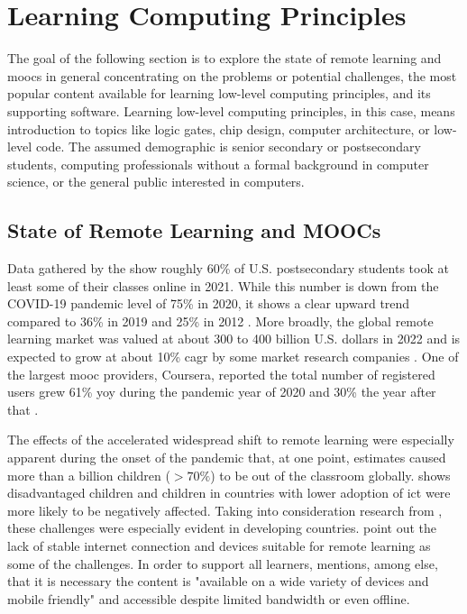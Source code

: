 \section{Learning Computing Principles}

The goal of the following section is to explore the state of remote learning and \glspl{mooc} in general concentrating on the problems or potential challenges, the most popular content available for learning low-level computing principles, and its supporting software.
Learning low-level computing principles, in this case, means introduction to topics like logic gates, chip design, computer architecture, or low-level code.
The assumed demographic is senior secondary or postsecondary students, computing professionals without a formal background in computer science, or the general public interested in computers.

\subsection{State of Remote Learning and MOOCs}
\label{sec:learning-state}

Data gathered by the \textcite{us_doe_digest_2021} show roughly 60\% of U.S. postsecondary students took at least some of their classes online in 2021.
While this number is down from the COVID-19 pandemic level of 75\% in 2020, it shows a clear upward trend compared to 36\% in 2019 and 25\% in 2012 \parencite{us_doe_digest_2021}.
More broadly, the global remote learning market was valued at about 300 to 400 billion U.S. dollars in 2022 and is expected to grow at about 10\% \gls{cagr} by some market research companies \parencites{GlobalElearning_GIA_2023}{GlobalElearning_GMI_2023}.
One of the largest \gls{mooc} providers, Coursera, reported the total number of registered users grew 61\% \gls{yoy} during the pandemic year of 2020 and 30\% the year after that \parencite{Coursera_Impact_2021}.

The effects of the accelerated widespread shift to remote learning were especially apparent during the onset of the pandemic that, at one point, \textcite{UNESCO_2022} estimates caused more than a billion children ($>70\%$) to be out of the classroom globally.
\textcite{eu_covid_learning_2023} shows disadvantaged children and children in countries with lower adoption of \gls{ict} were more likely to be negatively affected.
Taking into consideration research from \textcite{tadesse_impact_2020}, these challenges were especially evident in developing countries.
\textcite{tadesse_impact_2020} point out the lack of stable internet connection and devices suitable for remote learning as some of the challenges.
In order to support all learners, \textcite{Ali_2020} mentions, among else, that it is necessary the content is "available on a wide variety of devices and mobile friendly" and accessible despite limited bandwidth or even offline.

